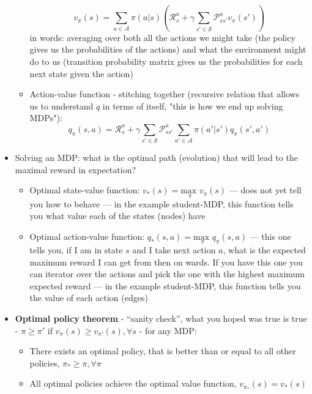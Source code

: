 \documentclass{article}
\begin{document}
\begin{itemize}
\begin{itemize}
        \begin{equation}
            v_\pi(s)=\sum_{a\in \mathcal{A}}\pi(a|s) \left( \mathcal{R}^a_s+\gamma \sum_{s'\in \mathcal{S}}\mathcal{P}^a_{ss'}v_\pi(s') \right)
        \end{equation} 
        in words: averaging over both all the actions we might take (the policy gives us the probabilities of the actions) and what the environment might do to us (transition probability matrix gives us the probabilities for each next state given the action)
        \item Action-value function - stitching together (recursive relation that allows us to understand $q$ in terms of itself, "this is how we end up solving MDPs"):
        \begin{equation}
            q_\pi(s, a)=\mathcal{R}^a_s+\gamma \sum_{s'\in \mathcal{S}}\mathcal{P}^a_{ss'}\sum_{a'\in \mathcal{A}}\pi(a'|s')q_\pi(s', a')
        \end{equation}
    \end{itemize}
    \item Solving an MDP: what is the optimal path (evolution) that will lead to the maximal reward in expectation?
    \begin{itemize}
        \item Optimal state-value function: $v_*(s)=\underset{\pi}{\text{max }}  v_\pi(s)$ --- does not yet tell you how to behave --- in the example student-MDP, this function tells you what value each of the states (nodes) have
        \item Optimal action-value function: $q_*(s, a)=\underset{\pi}{\text{max }} q_\pi(s, a)$ --- this one tells you, if I am in state $s$ and I take next action $a$, what is the expected maximum reward I can get from then on wards. If you have this one you can iterator over the actions and pick the one with the highest maximum expected reward --- in the example student-MDP, this function tells you the value of each action (edges) 
    \end{itemize}
    \item \textbf{Optimal policy theorem} - ``sanity check'', what you hoped was true is true - $\pi \geq \pi'$ if $v_\pi(s) \geq v_{\pi'}(s), \forall s$ - for any MDP:
    \begin{itemize}
        \item There exists an optimal policy, that is better than or equal to all other policies, $\pi_* \geq \pi, \forall \pi$
        \item All optimal policies achieve the optimal value function, $v_{\pi_*}(s)=v_*(s)$

\end{itemize}
\end{itemize}
\end{document}
